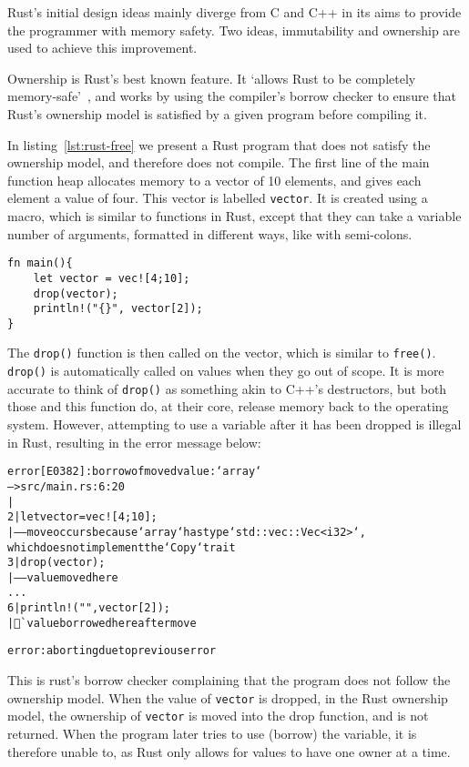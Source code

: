 Rust's initial design ideas mainly diverge from C and C++ in its aims to provide the programmer with memory safety. Two ideas, immutability and ownership are used to achieve this improvement. 

Ownership is Rust's best known feature. It `allows Rust to be completely memory-safe'~\cite{NomOwner}, and works by using the compiler's borrow checker to ensure that Rust's ownership model is satisfied by a given program before compiling it.

In listing~\ref{lst:rust-free} we present a Rust program that does not satisfy the ownership model, and therefore does not compile. The first line of the main function heap allocates memory to a vector of 10 elements, and gives each element a value of four. This vector is labelled \texttt{vector}. It is created using a macro, which is similar to functions in Rust, except that they can take a variable number of arguments, formatted in different ways, like with semi-colons.

\begin{code}
\begin{verbatim}
fn main(){
    let vector = vec![4;10];
    drop(vector);
    println!("{}", vector[2]);
}
\end{verbatim}
\label{lst:rust-free}
\end{code}

The \texttt{drop()} function is then called on the vector, which is similar to \texttt{free()}. \texttt{drop()} is automatically called on values when they go out of scope. It is more accurate to think of \texttt{drop()} as something akin to C++'s destructors, but both those and this function do, at their core, release memory back to the operating system. However, attempting to use a variable after it has been dropped is illegal in Rust, resulting in the error message below:

\begin{alltt}
\scriptsize
error[E0382]: borrow of moved value: `array`
 --> src/main.rs:6:20
  |
2 |     let vector = vec![4;10];
  |         ----- move occurs because `array` has type `std::vec::Vec<i32>`,
  which does not implement the `Copy` trait
3 |     drop(vector);
  |          ----- value moved here
...
6 |     println!("{}", vector[2]);
  |                    ^^^^^ value borrowed here after move

error: aborting due to previous error
\end{alltt}

This is rust's borrow checker complaining that the program does not follow the ownership model. When the value of \texttt{vector} is dropped, in the Rust ownership model, the ownership of \texttt{vector} is moved into the drop function, and is not returned. When the program later tries to use (borrow) the variable, it is therefore unable to, as Rust only allows for values to have one owner at a time.



